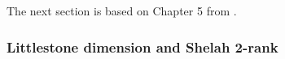 The next section is based on Chapter 5 from \cite{Bhaskar2021}.






\subsubsection{Littlestone dimension and Shelah 2-rank}

